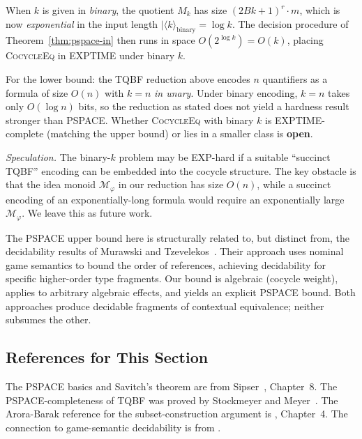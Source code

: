 \begin{remark}
\label{rem:binary}
When $k$ is given in \emph{binary}, the quotient $M_k$ has size
$(2Bk+1)^r\cdot m$, which is now \emph{exponential} in the input
length $|\langle k\rangle_{\mathrm{binary}}=\log k$.  The decision
procedure of Theorem~\ref{thm:pspace-in} then runs in space
$O(2^{\log k})=O(k)$, placing \textsc{CocycleEq} in
\textsc{EXPTIME} under binary $k$.

For the lower bound: the TQBF reduction above encodes $n$
quantifiers as a formula of size $O(n)$ with $k=n$ \emph{in unary}.
Under binary encoding, $k=n$ takes only $O(\log n)$ bits, so the
reduction as stated does not yield a hardness result stronger than
\textsc{PSPACE}.  Whether \textsc{CocycleEq} with binary $k$ is
\textsc{EXPTIME}-complete (matching the upper bound) or lies in a
smaller class is \textbf{open}.

\emph{Speculation.}  The binary-$k$ problem may be
\textsc{EXP}-hard if a suitable ``succinct TQBF'' encoding can be
embedded into the cocycle structure.  The key obstacle is that the
idea monoid $\mathcal{M}_\varphi$ in our reduction has size $O(n)$,
while a succinct encoding of an exponentially-long formula would
require an exponentially large $\mathcal{M}_\varphi$.  We leave this
as future work.
\end{remark}

\begin{remark}
The PSPACE upper bound here is structurally related to, but distinct
from, the decidability results of Murawski and
Tzevelekos~\cite{MurawskiTzevelekos2012}.  Their approach uses
nominal game semantics to bound the order of references, achieving
decidability for specific higher-order type fragments.  Our bound is
algebraic (cocycle weight), applies to arbitrary algebraic effects,
and yields an explicit \textsc{PSPACE} bound.  Both approaches
produce decidable fragments of contextual equivalence; neither
subsumes the other.
\end{remark}

\subsection*{References for This Section}

\noindent
The \textsc{PSPACE} basics and Savitch's theorem are from
Sipser~\cite{Sipser2013}, Chapter~8.
The \textsc{PSPACE}-completeness of TQBF was proved by
Stockmeyer and Meyer~\cite{StockmeyerMeyer1973}.
The Arora-Barak reference for the subset-construction argument is
\cite{AroraBarak2009}, Chapter~4.
The connection to game-semantic decidability is from
\cite{MurawskiTzevelekos2012}.
